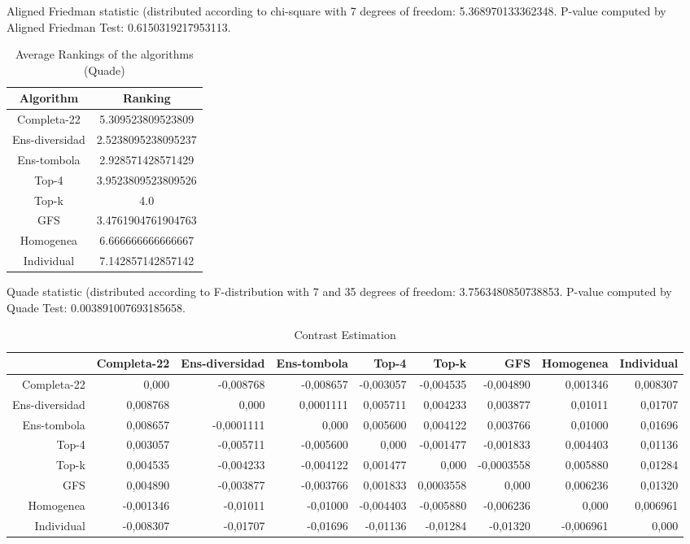 \documentclass[a4paper,10pt]{article}
\begin{document}
\begin{landscape}
Aligned Friedman statistic (distributed according to chi-square with 7 degrees of freedom: 5.368970133362348. 
P-value computed by Aligned Friedman Test: 0.6150319217953113.\newline


\newpage

\begin{table}[!htp]
\centering
\caption{Average Rankings of the algorithms (Quade)
}\begin{tabular}{c|c}
Algorithm&Ranking\\
\hline
Completa-22&5.309523809523809\\
Ens-diversidad&2.5238095238095237\\
Ens-tombola&2.928571428571429\\
Top-4&3.9523809523809526\\
Top-k&4.0\\
GFS&3.4761904761904763\\
Homogenea&6.666666666666667\\
Individual&7.142857142857142\\
\end{tabular}
\end{table}
Quade statistic (distributed according to F-distribution with 7 and 35 degrees of freedom: 3.7563480850738853. 
P-value computed by Quade Test: 0.003891007693185658.\newline


\newpage

\begin{table}[!htp]
\centering\tiny
\caption{Contrast Estimation}
\begin{tabular}{
|r|r|r|r|r|r|r|r|r|}
\hline
 &Completa-22&Ens-diversidad&Ens-tombola&Top-4&Top-k&GFS&Homogenea&Individual\\
\hline
Completa-22&0,000&-0,008768&-0,008657&-0,003057&-0,004535&-0,004890&0,001346&0,008307\\
\hline
Ens-diversidad&0,008768&0,000&0,0001111&0,005711&0,004233&0,003877&0,01011&0,01707\\
\hline
Ens-tombola&0,008657&-0,0001111&0,000&0,005600&0,004122&0,003766&0,01000&0,01696\\
\hline
Top-4&0,003057&-0,005711&-0,005600&0,000&-0,001477&-0,001833&0,004403&0,01136\\
\hline
Top-k&0,004535&-0,004233&-0,004122&0,001477&0,000&-0,0003558&0,005880&0,01284\\
\hline
GFS&0,004890&-0,003877&-0,003766&0,001833&0,0003558&0,000&0,006236&0,01320\\
\hline
Homogenea&-0,001346&-0,01011&-0,01000&-0,004403&-0,005880&-0,006236&0,000&0,006961\\
\hline
Individual&-0,008307&-0,01707&-0,01696&-0,01136&-0,01284&-0,01320&-0,006961&0,000\\
\hline


\end{tabular}
\end{table}
\end{landscape}
\end{document}

